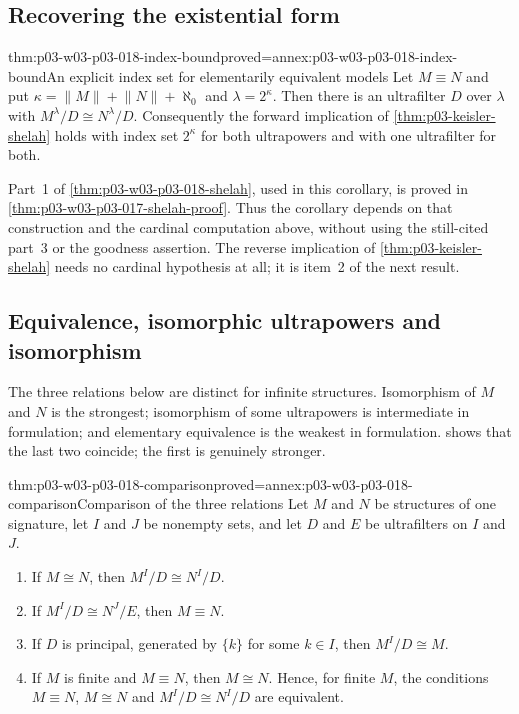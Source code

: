 \subsection{Recovering the existential form}

\begin{hbcorollary}{thm:p03-w03-p03-018-index-bound}{proved=annex:p03-w03-p03-018-index-bound}{An explicit index set for elementarily equivalent models}
Let \(M\equiv N\) and put
\(\kappa=\lVert M\rVert+\lVert N\rVert+\aleph_0\) and \(\lambda=2^\kappa\).
Then there is an ultrafilter \(D\) over \(\lambda\) with
\(M^\lambda/D\cong N^\lambda/D\).  Consequently the forward implication of
\cref{thm:p03-keisler-shelah} holds with index set \(2^\kappa\) for both
ultrapowers and with one ultrafilter for both.
\end{hbcorollary}

Part~1 of \cref{thm:p03-w03-p03-018-shelah}, used in this corollary,
is proved in \cref{thm:p03-w03-p03-017-shelah-proof}. Thus the corollary
depends on that construction and the cardinal computation above, without
using the still-cited part~3 or the goodness assertion. The reverse
implication of \cref{thm:p03-keisler-shelah} needs no cardinal hypothesis at
all; it is item~2 of the next result.

\subsection{Equivalence, isomorphic ultrapowers and isomorphism}

The three relations below are distinct for infinite structures.  Isomorphism
of \(M\) and \(N\) is the strongest; isomorphism of some ultrapowers is
intermediate in formulation; and elementary equivalence is the weakest in
formulation.   shows that the last two
coincide; the first is genuinely stronger.

\begin{hbtheorem}{thm:p03-w03-p03-018-comparison}{proved=annex:p03-w03-p03-018-comparison}{Comparison of the three relations}
Let \(M\) and \(N\) be structures of one signature, let \(I\) and \(J\) be
nonempty sets, and let \(D\) and \(E\) be ultrafilters on \(I\) and \(J\).
\begin{enumerate}
  \item If \(M\cong N\), then \(M^I/D\cong N^I/D\).
  \item If \(M^I/D\cong N^J/E\), then \(M\equiv N\).
  \item If \(D\) is principal, generated by \(\{k\}\) for some \(k\in I\),
        then \(M^I/D\cong M\).
  \item If \(M\) is finite and \(M\equiv N\), then \(M\cong N\).  Hence, for
        finite \(M\), the conditions \(M\equiv N\), \(M\cong N\) and
        \(M^I/D\cong N^I/D\) are equivalent.
\end{enumerate}
\end{hbtheorem}

